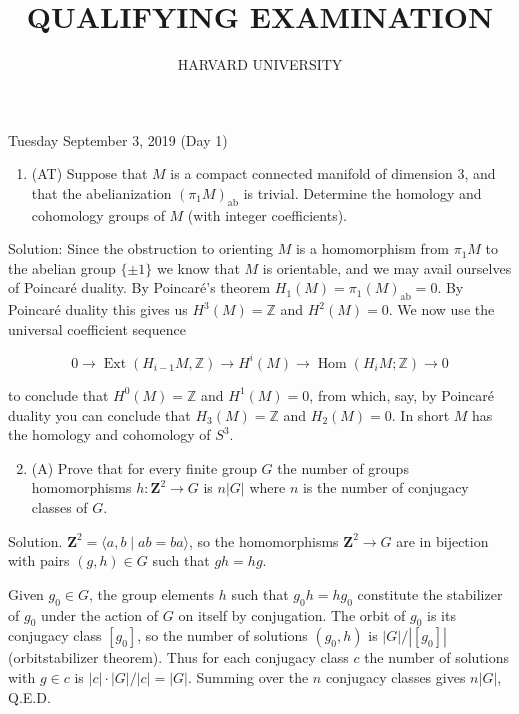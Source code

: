 \documentclass[10pt]{article}
\title{QUALIFYING EXAMINATION }
\author{HARVARD UNIVERSITY}
\date{}
\begin{document}
\maketitle
Tuesday September 3, 2019 (Day 1)

\begin{enumerate}
  \item (AT) Suppose that $M$ is a compact connected manifold of dimension 3, and that the abelianization $\left(\pi_{1} M\right)_{\mathrm{ab}}$ is trivial. Determine the homology and cohomology groups of $M$ (with integer coefficients).
\end{enumerate}

Solution: Since the obstruction to orienting $M$ is a homomorphism from $\pi_{1} M$ to the abelian group $\{ \pm 1\}$ we know that $M$ is orientable, and we may avail ourselves of Poincaré duality. By Poincaré's theorem $H_{1}(M)=\pi_{1}(M)_{\mathrm{ab}}=0$. By Poincaré duality this gives us $H^{3}(M)=\mathbb{Z}$ and $H^{2}(M)=0$. We now use the universal coefficient sequence

$$
0 \rightarrow \operatorname{Ext}\left(H_{i-1} M, \mathbb{Z}\right) \rightarrow H^{i}(M) \rightarrow \operatorname{Hom}\left(H_{i} M ; \mathbb{Z}\right) \rightarrow 0
$$

to conclude that $H^{0}(M)=\mathbb{Z}$ and $H^{1}(M)=0$, from which, say, by Poincaré duality you can conclude that $H_{3}(M)=\mathbb{Z}$ and $H_{2}(M)=0$. In short $M$ has the homology and cohomology of $S^{3}$.

\begin{enumerate}
  \setcounter{enumi}{1}
  \item (A) Prove that for every finite group $G$ the number of groups homomorphisms $h: \mathbf{Z}^{2} \rightarrow G$ is $n|G|$ where $n$ is the number of conjugacy classes of $G$.
\end{enumerate}

Solution. $\mathbf{Z}^{2}=\langle a, b \mid a b=b a\rangle$, so the homomorphisms $\mathbf{Z}^{2} \rightarrow G$ are in bijection with pairs $(g, h) \in G$ such that $g h=h g$.

Given $g_{0} \in G$, the group elements $h$ such that $g_{0} h=h g_{0}$ constitute the stabilizer of $g_{0}$ under the action of $G$ on itself by conjugation. The orbit of $g_{0}$ is its conjugacy class $\left[g_{0}\right]$, so the number of solutions $\left(g_{0}, h\right)$ is $|G| /\left|\left[g_{0}\right]\right|$ (orbitstabilizer theorem). Thus for each conjugacy class $c$ the number of solutions with $g \in c$ is $|c| \cdot|G| /|c|=|G|$. Summing over the $n$ conjugacy classes gives $n|G|$, Q.E.D.
\end{document}
